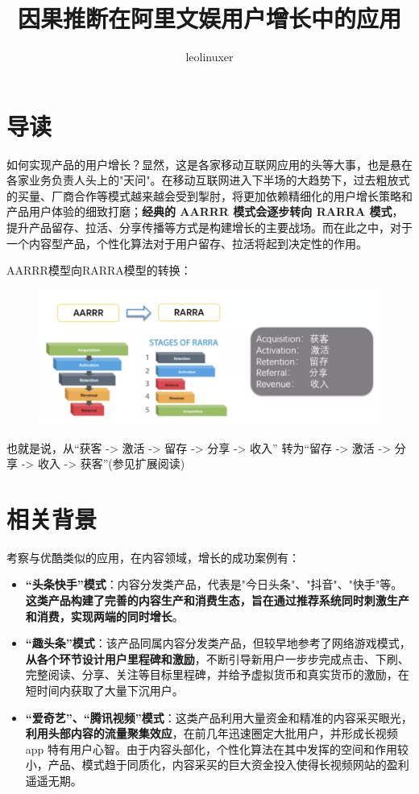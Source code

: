 \documentclass[12pt]{article}
\title{因果推断在阿里文娱用户增长中的应用\cite{Causal_Inference_In_Ali_User_Growth}}
\author{leolinuxer}
\begin{document}
\maketitle
\tableofcontents

\section{导读}
如何实现产品的用户增长？显然，这是各家移动互联网应用的头等大事，也是悬在各家业务负责人头上的"天问"。在移动互联网进入下半场的大趋势下，过去粗放式的买量、厂商合作等模式越来越会受到掣肘，将更加依赖精细化的用户增长策略和产品用户体验的细致打磨；\textbf{经典的 AARRR 模式会逐步转向 RARRA 模式}，提升产品留存、拉活、分享传播等方式是构建增长的主要战场。而在此之中，对于一个内容型产品，个性化算法对于用户留存、拉活将起到决定性的作用。

AARRR模型向RARRA模型的转换：
\begin{figure}[H]
    \centering
    \includegraphics[width=1\textwidth]{fig/CasualInferenceInAli-User-Growth-Model.png}
    
\end{figure}
\begin{framed}
也就是说，从“获客 -> 激活  -> 留存 -> 分享 -> 收入” 转为“留存 -> 激活 -> 分享 -> 收入 -> 获客”(参见扩展阅读)
\end{framed}

\section{相关背景}
考察与优酷类似的应用，在内容领域，增长的成功案例有：
\begin{itemize}
\setlength{\itemsep}{0pt}
\setlength{\parsep}{0pt}
\setlength{\parskip}{0pt}
    \item \textbf{“头条快手”模式}：内容分发类产品，代表是"今日头条"、"抖音"、"快手"等。\textbf{这类产品构建了完善的内容生产和消费生态，旨在通过推荐系统同时刺激生产和消费，实现两端的同时增长}。
    \item \textbf{“趣头条”模式}：该产品同属内容分发类产品，但较早地参考了网络游戏模式，\textbf{从各个环节设计用户里程碑和激励}，不断引导新用户一步步完成点击、下刷、完整阅读、分享、关注等目标里程碑，并给予虚拟货币和真实货币的激励，在短时间内获取了大量下沉用户。
    \item \textbf{“爱奇艺”、“腾讯视频”模式}：这类产品利用大量资金和精准的内容采买眼光，\textbf{利用头部内容的流量聚集效应}，在前几年迅速圈定大批用户，并形成长视频 app 特有用户心智。由于内容头部化，个性化算法在其中发挥的空间和作用较小，产品、模式趋于同质化，内容采买的巨大资金投入使得长视频网站的盈利遥遥无期。
\end{itemize}
\end{document}
